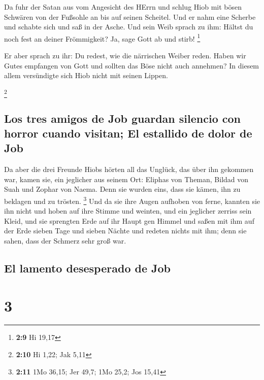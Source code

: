  Da fuhr der Satan aus vom Angesicht des HErrn und schlug
Hiob mit bösen Schwären von der Fußsohle an bis auf seinen Scheitel.
 Und er nahm eine Scherbe und schabte sich und saß in der
Asche.  Und sein Weib sprach zu ihm: Hältst du noch fest
an deiner Frömmigkeit? Ja, sage Gott ab und stirb! \footnote{\textbf{2:9}
  Hi 19,17}

 Er aber sprach zu ihr: Du redest, wie die närrischen
Weiber reden. Haben wir Gutes empfangen von Gott und sollten das Böse
nicht auch annehmen? In diesem allem versündigte sich Hiob nicht mit
seinen Lippen.

\footnote{\textbf{2:10} Hi 1,22; Jak 5,11}

\hypertarget{los-tres-amigos-de-job-guardan-silencio-con-horror-cuando-visitan-el-estallido-de-dolor-de-job}{%
\subsection{Los tres amigos de Job guardan silencio con horror cuando
visitan; El estallido de dolor de
Job}\label{los-tres-amigos-de-job-guardan-silencio-con-horror-cuando-visitan-el-estallido-de-dolor-de-job}}

 Da aber die drei Freunde Hiobs hörten all das Unglück,
das über ihn gekommen war, kamen sie, ein jeglicher aus seinem Ort:
Eliphas von Theman, Bildad von Suah und Zophar von Naema. Denn sie
wurden eins, dass sie kämen, ihn zu beklagen und zu trösten. \footnote{\textbf{2:11}
  1Mo 36,15; Jer 49,7; 1Mo 25,2; Jos 15,41}  Und da sie
ihre Augen aufhoben von ferne, kannten sie ihn nicht und hoben auf ihre
Stimme und weinten, und ein jeglicher zerriss sein Kleid, und sie
sprengten Erde auf ihr Haupt gen Himmel  und saßen mit
ihm auf der Erde sieben Tage und sieben Nächte und redeten nichts mit
ihm; denn sie sahen, dass der Schmerz sehr groß war.

\hypertarget{el-lamento-desesperado-de-job}{%
\subsection{El lamento desesperado de
Job}\label{el-lamento-desesperado-de-job}}

\hypertarget{section-2}{%
\section{3}\label{section-2}}


